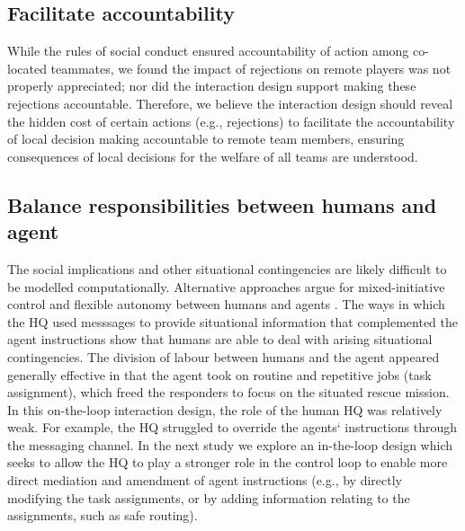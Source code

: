 \subsection{Facilitate accountability}
While the rules of social conduct ensured accountability of action among co-located teammates, we found the impact of rejections on remote players was not properly appreciated; nor did the interaction design support making these rejections accountable. Therefore, we believe the interaction design should reveal the hidden cost of certain actions (e.g., rejections) to facilitate the accountability of local decision making accountable to remote team members, ensuring consequences of local decisions for the welfare of all teams are understood. 

\subsection{Balance responsibilities between humans and agent}\label{sec:balanceResponsibility}
 The social implications and other situational contingencies are likely difficult to be modelled computationally. Alternative approaches argue for mixed-initiative  control and flexible autonomy between humans and agents \citep{Bradshaw2011}. The ways in which the HQ used messsages to provide situational information that complemented the agent instructions show that humans are able to deal with arising situational contingencies. The division of labour between humans and the agent appeared generally effective in that the agent took on routine and repetitive jobs (task assignment), which freed the responders to focus on the situated rescue mission. In this on-the-loop interaction design, the role of the human HQ was relatively weak. For example, the HQ struggled to override the agents` instructions through the messaging channel. In the next study we explore an in-the-loop design which seeks to allow the HQ to play a stronger role in the control loop to enable more direct mediation and amendment of agent instructions (e.g., by directly modifying the task assignments, or by adding information relating to the assignments, such as safe routing).
 

